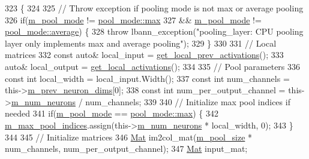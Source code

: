 \begin{DoxyCode}
323                            \{
324 
325     \textcolor{comment}{// Throw exception if pooling mode is not max or average pooling}
326     \textcolor{keywordflow}{if}(\hyperlink{classlbann_1_1pooling__layer_a7b19407c88f89757e64ed3d4afab8443}{m\_pool\_mode} != \hyperlink{base_8hpp_ac47a6ee5278a53898222a48639a2bf39a2ffe4e77325d9a7152f7086ea7aa5114}{pool\_mode::max}
327        && \hyperlink{classlbann_1_1pooling__layer_a7b19407c88f89757e64ed3d4afab8443}{m\_pool\_mode} != \hyperlink{base_8hpp_ac47a6ee5278a53898222a48639a2bf39a6927a3a7218a3195858411433ec20a21}{pool\_mode::average}) \{
328       \textcolor{keywordflow}{throw} lbann\_exception(\textcolor{stringliteral}{"pooling\_layer: CPU pooling layer only implements max and average pooling"});
329     \}
330 
331     \textcolor{comment}{// Local matrices}
332     \textcolor{keyword}{const} \textcolor{keyword}{auto}& local\_input = \hyperlink{classlbann_1_1Layer_a35397843bb0c84030000c7d872229acb}{get\_local\_prev\_activations}();
333     \textcolor{keyword}{auto}& local\_output = \hyperlink{classlbann_1_1Layer_a4248f27acebf72b7b7b3ee39c8bcb62a}{get\_local\_activations}();
334 
335     \textcolor{comment}{// Pool parameters}
336     \textcolor{keyword}{const} \textcolor{keywordtype}{int} local\_width = local\_input.Width();
337     \textcolor{keyword}{const} \textcolor{keywordtype}{int} num\_channels = this->\hyperlink{classlbann_1_1Layer_ae204d1a2a79606eaa117273857ff62a3}{m\_prev\_neuron\_dims}[0];
338     \textcolor{keyword}{const} \textcolor{keywordtype}{int} num\_per\_output\_channel = this->\hyperlink{classlbann_1_1Layer_a6b5ebc8a7d9329d8a773ed787e7b41d8}{m\_num\_neurons} / num\_channels;
339 
340     \textcolor{comment}{// Initialize max pool indices if needed}
341     \textcolor{keywordflow}{if}(\hyperlink{classlbann_1_1pooling__layer_a7b19407c88f89757e64ed3d4afab8443}{m\_pool\_mode} == \hyperlink{base_8hpp_ac47a6ee5278a53898222a48639a2bf39a2ffe4e77325d9a7152f7086ea7aa5114}{pool\_mode::max}) \{
342       \hyperlink{classlbann_1_1pooling__layer_a58683798db4c48175cbad5ec32ff676c}{m\_max\_pool\_indices}.assign(this->\hyperlink{classlbann_1_1Layer_a6b5ebc8a7d9329d8a773ed787e7b41d8}{m\_num\_neurons} * local\_width, 0);
343     \}
344 
345     \textcolor{comment}{// Initialize matrices}
346     \hyperlink{base_8hpp_a68f11fdc31b62516cb310831bbe54d73}{Mat} im2col\_mat(\hyperlink{classlbann_1_1pooling__layer_a8b3a9020bb896a1132c9823bc2c73515}{m\_pool\_size} * num\_channels, num\_per\_output\_channel);
347     \hyperlink{base_8hpp_a68f11fdc31b62516cb310831bbe54d73}{Mat} input\_mat;

\end{DoxyCode}
